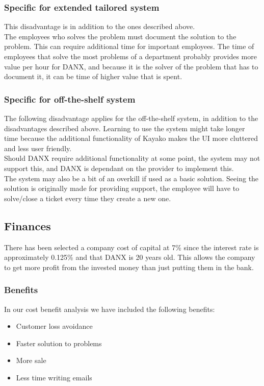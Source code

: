 \subsubsection{Specific for extended tailored system}
This disadvantage is in addition to the ones described above.\\
The employees who solves the problem must document the solution to the problem. This can require additional time for important employees. The time of employees that solve the most problems of a department probably provides more value per hour for DANX, and because it is the solver of the problem that has to document it, it can be time of higher value that is spent.

\subsubsection{Specific for off-the-shelf system}
The following disadvantage applies for the off-the-shelf system, in addition to the disadvantages described above. Learning to use the system might take longer time because the additional functionality of Kayako makes the UI more cluttered and less user friendly.\\
Should DANX require additional functionality at some point, the system may not support this, and DANX is dependant on the provider to implement this.\\
The system may also be a bit of an overkill if used as a basic solution. Seeing the solution is originally made for providing support, the employee will have to solve/close a ticket every time they create a new one.

\subsection{Finances}
There has been selected a company cost of capital at 7\% since the interest rate is approximately 0.125\% \cite{bank001} and that DANX is 20 years old\cite{webpage010}. This allows the company to get more profit from the invested money than just putting them in the bank.

\subsubsection{Benefits}
In our cost benefit analysis we have included the following benefits:

\begin{itemize}
\item Customer loss avoidance
\item Faster solution to problems
\item More sale
\item Less time writing emails
\end{itemize}

